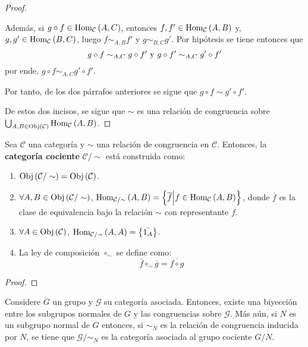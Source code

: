 \documentclass[12pt]{report}
\theoremstyle{largebreak}
\newcommand{\Obj}[1]{\ensuremath{\textup{Obj}\left(#1\right)}}
\newcommand{\Hom}[3]{\ensuremath{\textup{Hom}_{#1}\left(#2,#3\right)}}
\begin{document}
\begin{proof}
\begin{enumerate}
            Además, si $g\circ f\in\Hom{\mathcal{C}}{A}{C}$, entonces $f,f'\in\Hom{\mathcal{C}}{A}{B}$ y, $g,g'\in\Hom{\mathcal{C}}{B}{C}$, luego $f\sim_{A,B}f'$ y $g\sim_{B,C}g'$. Por hipótesis se tiene entonces que
            \begin{equation*}
                g\circ f\sim_{A,C}g\circ f'\textup{ y }g\circ f'\sim_{A,C}g'\circ f'
            \end{equation*}
            por ende, $g\circ f\sim_{A,C}g'\circ f'$.

            Por tanto, de los dos párrafos anteriores se sigue que $g\circ f\sim g'\circ f'$.
        \end{enumerate}
        De estos dos incisos, se sigue que $\sim$ es una relación de congruencia sobre $\bigcup_{A,B\in\Obj{\mathcal{C}}}\Hom{\mathcal{C}}{A}{B}$.
    \end{proof}

    \begin{mydef}
        Sea $\mathcal{C}$ una categoría y $\sim$ una relación de congruencia en $\mathcal{C}$. Entonces, la \textbf{categoría cociente} $\mathcal{C}/\sim$ está construida como:
        \begin{enumerate}
            \item $\Obj{\mathcal{C}/\sim}=\Obj{\mathcal{C}}$.
            \item $\forall A,B\in\Obj{\mathcal{C}/\sim}$, $\Hom{\mathcal{C}/\sim}{A}{B}=\left\{\overline{f}\Big|f\in\Hom{\mathcal{C}}{A}{B} \right\}$, donde $\overline{f}$ es la clase de equivalencia bajo la relación $\sim$ con representante $f$.
            \item $\forall A\in\Obj{\mathcal{C}}$, $\Hom{\mathcal{C}/\sim}{A}{A}=\left\{\bar{1_A} \right\}$.
            \item La ley de composición $\circ_\sim$ se define como:
            \begin{equation*}
                \overline{f}\circ_\sim\overline{g}=\overline{f\circ g}
            \end{equation*}
        \end{enumerate}
    \end{mydef}

    \begin{proof}
        
    \end{proof}

    \begin{exa}
        Considere $G$ un grupo y $\mathcal{G}$ su categoría asociada. Entonces, existe una biyección entre los subgrupos normales de $G$ y las congruencias sobre $\mathcal{G}$. Más aún, si $N$ es un subgrupo normal de $G$ entonces, si $\sim_N$ es la relación de congruencia inducida por $N$, se tiene que $\mathcal{G}/\sim_N$ es la categoría asociada al grupo cociente $G/N$.
    \end{exa}
\end{document}
